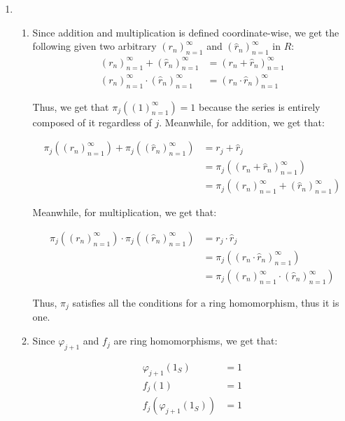 \documentclass{article}
\begin{document}
\begin{enumerate}
    \newpage

    \item 
    \begin{enumerate}
        \item 
        Since addition and multiplication is defined coordinate-wise, we get the following given two arbitrary $(r_n)_{n=1}^\infty$ and  $(\hat{r}_n)_{n=1}^\infty$ in $R$: 
        \begin{align*}
            (r_n)_{n=1}^\infty + (\hat{r}_n)_{n=1}^\infty &= (r_n + \hat{r}_n)_{n=1}^\infty \\
            (r_n)_{n=1}^\infty \cdot (\hat{r}_n)_{n=1}^\infty &= (r_n \cdot \hat{r}_n)_{n=1}^\infty
        \end{align*}

        Thus, we get that $\pi_j((1)_{n=1}^\infty) = 1$ because the series is entirely composed of it regardless of $j$. Meanwhile, for addition, we get that: 

        \begin{align*}
            \pi_j((r_n)_{n=1}^\infty) + \pi_j((\hat{r}_n)_{n=1}^\infty) &= r_j + \hat{r}_j \\
            &= \pi_j((r_n + \hat{r}_n)_{n=1}^\infty )\\
            &= \pi_j((r_n)_{n=1}^\infty + (\hat{r}_n)_{n=1}^\infty)
        \end{align*}

        Meanwhile, for multiplication, we get that: 

        \begin{align*}
            \pi_j((r_n)_{n=1}^\infty) \cdot \pi_j((\hat{r}_n)_{n=1}^\infty) &= r_j \cdot \hat{r}_j \\
            &= \pi_j((r_n \cdot \hat{r}_n)_{n=1}^\infty )\\
            &= \pi_j((r_n)_{n=1}^\infty \cdot (\hat{r}_n)_{n=1}^\infty)
        \end{align*}

        Thus, $\pi_j$ satisfies all the conditions for a ring homomorphism, thus it is one. \\

        \item 
        Since $\varphi_{j+1}$ and $f_j$ are ring homomorphisms, we get that: 

        \begin{align*}
            \varphi_{j+1}(1_S) &= 1 \\
            f_j(1) &= 1 \\
            f_j(\varphi_{j+1}(1_S)) &= 1
        \end{align*}


\end{enumerate}
\end{enumerate}
\end{document}
